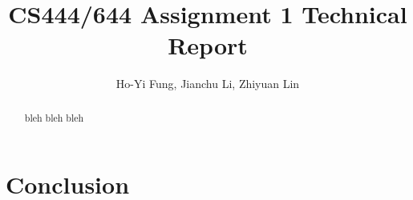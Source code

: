 \documentclass[notitlepage]{report}
\title{CS444/644 Assignment 1 Technical Report}
\author{Ho-Yi Fung, Jianchu Li, Zhiyuan Lin}
\date{}
\begin{document}
{\let\newpage\relax\maketitle}
\begin{abstract}
bleh bleh bleh
\end{abstract}


\tableofcontents












\chapter{Conclusion}



\end{document}

